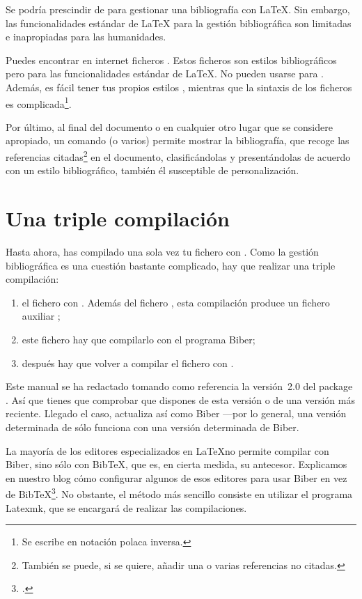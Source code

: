 \begin{plusloins}
Se podría prescindir de   para gestionar una bibliografía con \LaTeX{}. Sin embargo, las funcionalidades estándar de \LaTeX{} para la gestión bibliográfica son limitadas e inapropiadas para las humanidades. 

Puedes encontrar en internet ficheros . Estos ficheros son estilos bibliográficos pero para las funcionalidades estándar de  \LaTeX{}. No pueden usarse para . Además, es fácil tener tus propios estilos , mientras que la sintaxis de los ficheros  es complicada\footnote{Se escribe en notación polaca inversa.}.
\end{plusloins}

Por último, al final del documento o en cualquier otro lugar que se considere apropiado, un comando (o varios) permite mostrar la bibliografía, que recoge las referencias citadas\footnote{También se puede, si se quiere, añadir una o varias referencias no citadas.} en el documento, clasificándolas y presentándolas de acuerdo con un estilo bibliográfico, también él susceptible de personalización.

\section{Una triple compilación}\label{3compil}

Hasta ahora, has compilado una sola vez tu fichero  con \XeLaTeX. Como la gestión bibliográfica es una cuestión bastante complicado, hay que realizar una triple compilación:
\begin{enumerate}
\item el fichero  con \XeLaTeX. Además del fichero , esta compilación produce un fichero auxiliar ;
\item este fichero hay que compilarlo con el programa Biber;
\item después hay que volver a compilar el fichero  con \XeLaTeX.
\end{enumerate}


\begin{attention}
Este manual se ha redactado tomando como referencia la versión~2.0 del package . Así que tienes que comprobar que dispones de esta versión o de una versión más reciente. Llegado el caso, actualiza  así como Biber ---por lo general, una versión determinada de  sólo funciona con una versión determinada de Biber.
\end{attention}

\begin{attention}
La mayoría de los editores especializados en \LaTeX no permite compilar con Biber, sino sólo con BibTeX, que es, en cierta medida, su antecesor. Explicamos en nuestro blog cómo configurar algunos de esos editores para usar Biber en vez de  BibTeX\footcite{biber_logiciels}. No obstante, el método más sencillo consiste en utilizar el programa Latexmk, que se encargará de realizar las compilaciones.
\end{attention}






